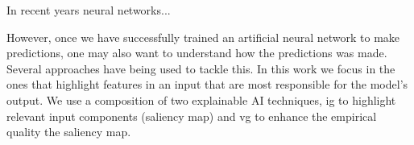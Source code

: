 In recent years neural networks...

However, once we have successfully trained an artificial neural network to make predictions, one may also want to understand how the predictions was
made. Several approaches have being used to tackle this. In this work we focus in the ones that highlight features in an input that are most responsible for the model's output. We use a composition of two explainable AI techniques, \gls{ig} \cite{sundararajan2017axiomatic} to highlight relevant input components (saliency map) and \gls{vg} \cite{adebayo2020sanity} to enhance the empirical quality the saliency map.
